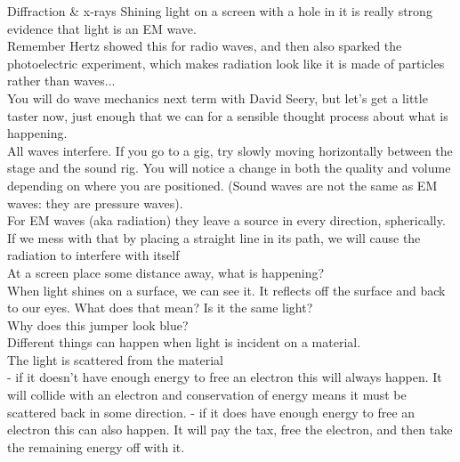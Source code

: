 \begin{frame}{Diffraction \& x-rays}
\small
Shining light on a screen with a hole in it is really strong evidence that light is an EM wave.\\[1ex]

Remember Hertz showed this for radio waves, and then also sparked the photoelectric experiment, which makes radiation look like it is made of particles rather than waves...\\

You will do wave mechanics next term with David Seery, but let's get a little taster now, just enough that we can  for a sensible thought process about what is happening.\\

All waves interfere. If you go to a gig, try slowly moving horizontally between the stage and the sound rig. You will notice a change in both the quality and volume depending on where you are positioned. (Sound waves are not the same as EM waves: they are pressure waves).\\

For EM waves (aka radiation) they leave a source in every direction, spherically.\\

If we mess with that by placing a straight line in its path, we will cause the radiation to interfere with itself\\

At a screen place some distance away, what is happening?\\

When light shines on a surface, we can see it. It reflects off the surface and back to our eyes. What does that mean? Is it the same light?\\

Why does this jumper look blue?\\

Different things can happen when light is incident on a material. \\

The light is scattered from the material\\
- if it doesn't have enough energy to free an electron this will always happen. It will collide with an electron and conservation of energy means it must be scattered back in some direction.
- if it does have enough energy to free an electron this can also happen. It will pay the tax, free the electron, and then take the remaining energy off with it.\\


\end{frame}
